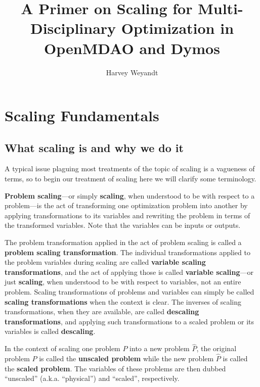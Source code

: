 \documentclass{article}
\title{A Primer on Scaling for Multi-Disciplinary Optimization in OpenMDAO and Dymos}
\author{Harvey Weyandt}
\date{}
\begin{document}
\maketitle

\tableofcontents

\newpage
\section{Scaling Fundamentals}

\subsection*{What scaling is and why we do it}

A typical issue plaguing most treatments of the topic of scaling is a vagueness of terms, so to begin our treatment of scaling here we will clarify some terminology.

\textbf{Problem scaling}---or simply \textbf{scaling}, when understood to be with respect to a problem---is the act of transforming one optimization problem into another by applying transformations to its variables and rewriting the problem in terms of the transformed variables. Note that the variables can be inputs or outputs. 

The problem transformation applied in the act of problem scaling is called a \textbf{problem scaling transformation}. The individual transformations applied to the problem variables during scaling are called \textbf{variable scaling transformations}, and the act of applying those is called \textbf{variable scaling}---or just \textbf{scaling}, when understood to be with respect to variables, not an entire problem. Scaling transformations of problems and variables can simply be called \textbf{scaling transformations} when the context is clear. The inverses of scaling transformations, when they are available, are called \textbf{descaling transformations}, and applying such transformations to a scaled problem or its variables is called \textbf{descaling}.

In the context of scaling one problem $P$ into a new problem $\hat{P}$, the original problem $P$ is called the \textbf{unscaled problem} while the new problem $\hat{P}$ is called the \textbf{scaled problem}. The variables of these problems are then dubbed ``unscaled'' (a.k.a. ``physical'') and ``scaled'', respectively.
\\
\end{document}
